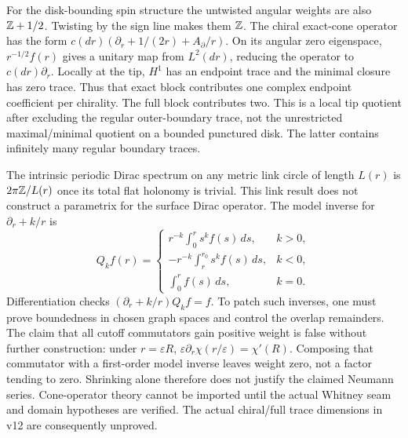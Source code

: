 \documentclass[11pt]{article}
\theoremstyle{readable}
\theoremstyle{remark}\newtheorem{remark}[theorem]{Remark}
\newcommand{\dd}{\,d}\newcommand{\norm}[1]{\left\lVert#1\right\rVert}
\begin{document}
For the disk-bounding spin structure the untwisted angular weights are also
$\mathbb Z+1/2$. Twisting by the sign line makes them $\mathbb Z$.
The chiral exact-cone operator has the form
$c(dr)(\partial_r+1/(2r)+A_\partial/r)$. On its angular zero eigenspace,
$r^{-1/2}f(r)$ gives a unitary map from $L^2(dr)$, reducing the operator
to $c(dr)\partial_r$. Locally at the tip, $H^1$ has an endpoint trace and
the minimal closure has zero trace. Thus that exact block contributes one
complex endpoint coefficient per chirality. The full block contributes two.
This is a local tip quotient after excluding the regular outer-boundary
trace, not the unrestricted maximal/minimal quotient on a bounded punctured
disk. The latter contains infinitely many regular boundary traces.

The intrinsic periodic Dirac spectrum on any metric link circle of length
$L(r)$ is $2\pi\mathbb Z/L(r)$ once its total flat holonomy is trivial. This
link result does not construct a parametrix for the surface Dirac operator.
The model inverse for $\partial_r+k/r$ is
\[
 Q_kf(r)=\begin{cases}
 r^{-k}\int_0^r s^kf(s)\dd s,&k>0,\\
 -r^{-k}\int_r^{r_0}s^kf(s)\dd s,&k<0,\\
 \int_0^rf(s)\dd s,&k=0.
 \end{cases}
\]
Differentiation checks $(\partial_r+k/r)Q_kf=f$. To patch such inverses,
one must prove boundedness in chosen graph spaces and control the overlap
remainders. The claim that all cutoff commutators gain positive weight is
false without further construction: under $r=\varepsilon R$,
$\varepsilon\partial_r\chi(r/\varepsilon)=\chi'(R)$. Composing that
commutator with a first-order model inverse leaves weight zero, not a
factor tending to zero. Shrinking alone therefore does not justify the
claimed Neumann series. Cone-operator theory \cite{cone,dirac} cannot be
imported until the actual Whitney seam and domain hypotheses are verified.
The actual chiral/full trace dimensions in v12 are consequently unproved.
\end{document}
